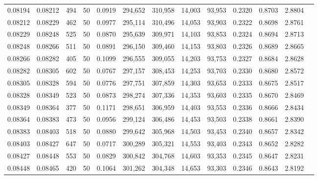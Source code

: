 \begin{tabular}{rrrrrrrrrrrrr}
0.08194 & 0.08212 &   494 &  50 &                                     0.0919 & 294,652 & 310,958 &  14,003 &  93,953 & 0.2320 & 0.8703 & 2.8804 \\
0.08212 & 0.08229 &   462 &  50 &                                     0.0977 & 295,114 & 310,496 &  14,053 &  93,903 & 0.2322 & 0.8698 & 2.8761 \\
0.08229 & 0.08248 &   525 &  50 &                                     0.0870 & 295,639 & 309,971 &  14,103 &  93,853 & 0.2324 & 0.8694 & 2.8713 \\
0.08248 & 0.08266 &   511 &  50 &                                     0.0891 & 296,150 & 309,460 &  14,153 &  93,803 & 0.2326 & 0.8689 & 2.8665 \\
0.08266 & 0.08282 &   405 &  50 &                                     0.1099 & 296,555 & 309,055 &  14,203 &  93,753 & 0.2327 & 0.8684 & 2.8628 \\
0.08282 & 0.08305 &   602 &  50 &                                     0.0767 & 297,157 & 308,453 &  14,253 &  93,703 & 0.2330 & 0.8680 & 2.8572 \\
0.08305 & 0.08328 &   594 &  50 &                                     0.0776 & 297,751 & 307,859 &  14,303 &  93,653 & 0.2333 & 0.8675 & 2.8517 \\
0.08328 & 0.08349 &   523 &  50 &                                     0.0873 & 298,274 & 307,336 &  14,353 &  93,603 & 0.2335 & 0.8670 & 2.8469 \\
0.08349 & 0.08364 &   377 &  50 &                                     0.1171 & 298,651 & 306,959 &  14,403 &  93,553 & 0.2336 & 0.8666 & 2.8434 \\
0.08364 & 0.08383 &   473 &  50 &                                     0.0956 & 299,124 & 306,486 &  14,453 &  93,503 & 0.2338 & 0.8661 & 2.8390 \\
0.08383 & 0.08403 &   518 &  50 &                                     0.0880 & 299,642 & 305,968 &  14,503 &  93,453 & 0.2340 & 0.8657 & 2.8342 \\
0.08403 & 0.08427 &   647 &  50 &                                     0.0717 & 300,289 & 305,321 &  14,553 &  93,403 & 0.2343 & 0.8652 & 2.8282 \\
0.08427 & 0.08448 &   553 &  50 &                                     0.0829 & 300,842 & 304,768 &  14,603 &  93,353 & 0.2345 & 0.8647 & 2.8231 \\
0.08448 & 0.08465 &   420 &  50 &                                     0.1064 & 301,262 & 304,348 &  14,653 &  93,303 & 0.2346 & 0.8643 & 2.8192 \\

\end{tabular}
